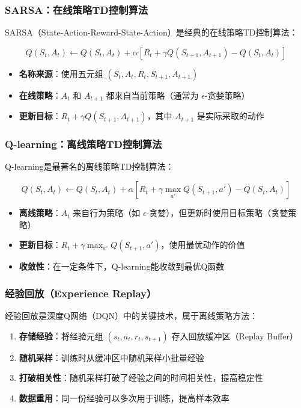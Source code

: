 \subsubsection{SARSA：在线策略TD控制算法}
SARSA（State-Action-Reward-State-Action）是经典的在线策略TD控制算法：

\[
Q(S_t, A_t) \leftarrow Q(S_t, A_t) + \alpha \left[ R_t + \gamma Q(S_{t+1}, A_{t+1}) - Q(S_t, A_t) \right]
\]

\begin{itemize}
    \item \textbf{名称来源}：使用五元组 $(S_t, A_t, R_t, S_{t+1}, A_{t+1})$
    \item \textbf{在线策略}：$A_t$ 和 $A_{t+1}$ 都来自当前策略（通常为 $\epsilon$-贪婪策略）
    \item \textbf{更新目标}：$R_t + \gamma Q(S_{t+1}, A_{t+1})$，其中 $A_{t+1}$ 是实际采取的动作
\end{itemize}

\subsubsection{Q-learning：离线策略TD控制算法}
Q-learning是最著名的离线策略TD控制算法：

\[
Q(S_t, A_t) \leftarrow Q(S_t, A_t) + \alpha \left[ R_t + \gamma \max_{a'} Q(S_{t+1}, a') - Q(S_t, A_t) \right]
\]

\begin{itemize}
    \item \textbf{离线策略}：$A_t$ 来自行为策略（如 $\epsilon$-贪婪），但更新时使用目标策略（贪婪策略）
    \item \textbf{更新目标}：$R_t + \gamma \max_{a'} Q(S_{t+1}, a')$，使用最优动作的价值
    \item \textbf{收敛性}：在一定条件下，Q-learning能收敛到最优Q函数
\end{itemize}

\subsubsection{经验回放（Experience Replay）}
经验回放是深度Q网络（DQN）中的关键技术，属于离线策略方法：

\begin{enumerate}
    \item \textbf{存储经验}：将经验元组 $(s_t, a_t, r_t, s_{t+1})$ 存入回放缓冲区（Replay Buffer）
    \item \textbf{随机采样}：训练时从缓冲区中随机采样小批量经验
    \item \textbf{打破相关性}：随机采样打破了经验之间的时间相关性，提高稳定性
    \item \textbf{数据重用}：同一份经验可以多次用于训练，提高样本效率
\end{enumerate}

